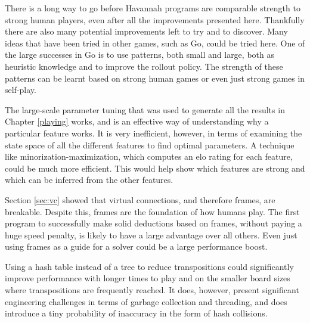 There is a long way to go before Havannah programs are comparable strength to strong human players, even after all the improvements presented here. Thankfully there are also many potential improvements left to try and to discover. Many ideas that have been tried in other games, such as Go, could be tried here. One of the large successes in Go is to use patterns, both small and large, both as heuristic knowledge and to improve the rollout policy. The strength of these patterns can be learnt based on strong human games or even just strong games in self-play.

The large-scale parameter tuning that was used to generate all the results in Chapter \ref{playing} works, and is an effective way of understanding why a particular feature works. It is very inefficient, however, in terms of examining the state space of all the different features to find optimal parameters. A technique like minorization-maximization, which computes an elo rating for each feature, could be much more efficient. This would help show which features are strong and which can be inferred from the other features.

Section \ref{sec:vc} showed that virtual connections, and therefore frames, are breakable. Despite this, frames are the foundation of how humans play. The first program to successfully make solid deductions based on frames, without paying a huge speed penalty, is likely to have a large advantage over all others. Even just using frames as a guide for a solver could be a large performance boost.

Using a hash table instead of a tree to reduce transpositions could significantly improve performance with longer times to play and on the smaller board sizes where transpositions are frequently reached. It does, however, present significant engineering challenges in terms of garbage collection and threading, and does introduce a tiny probability of inaccuracy in the form of hash collisions.








